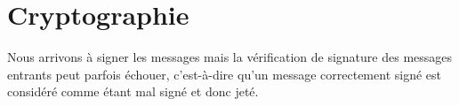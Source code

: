\section{Cryptographie}
Nous arrivons à signer les messages mais la vérification de signature des messages entrants peut parfois échouer, c'est-à-dire qu'un message correctement signé est considéré comme étant mal signé et donc jeté.

